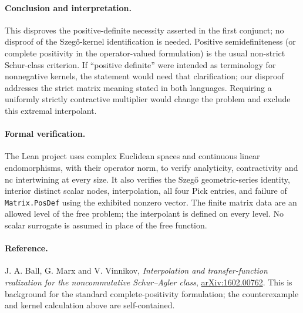 \documentclass[11pt]{article}
\begin{document}
\paragraph{Conclusion and interpretation.}
This disproves the positive-definite necessity asserted in the first
conjunct; no disproof of the Szeg\H{o}-kernel identification is needed.
Positive semidefiniteness (or complete positivity in the operator-valued
formulation) is the usual non-strict Schur-class criterion. If
``positive definite'' were intended as terminology for nonnegative
kernels, the statement would need that clarification; our disproof
addresses the strict matrix meaning stated in both languages.
Requiring a uniformly strictly contractive multiplier would change the
problem and exclude this extremal interpolant.

\paragraph{Formal verification.}
The Lean project uses complex Euclidean spaces and continuous linear
endomorphisms, with their operator norm, to verify analyticity,
contractivity and nc intertwining at every size. It also verifies the
Szeg\H{o} geometric-series identity, interior distinct scalar nodes,
interpolation, all four Pick entries, and failure of
\texttt{Matrix.PosDef} using the exhibited nonzero vector.
The finite matrix data are an allowed level of the free problem;
the interpolant is defined on every level. No scalar surrogate is
assumed in place of the free function.

\paragraph{Reference.}
J. A. Ball, G. Marx and V. Vinnikov, \emph{Interpolation and
transfer-function realization for the noncommutative Schur--Agler class},
\href{https://arxiv.org/abs/1602.00762}{arXiv:1602.00762}.
This is background for the standard complete-positivity formulation;
the counterexample and kernel calculation above are self-contained.
\end{document}
